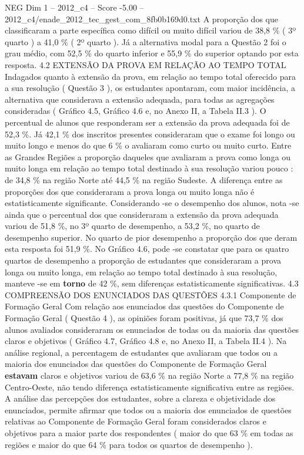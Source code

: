 \begin{textsample}{NEG Dim 1 – 2012\_c4 – Score -5.00 – 2012\_c4/enade\_2012\_tec\_gest\_com\_8fb0b169d0.txt}
A proporção dos que classificaram a parte específica como difícil ou muito difícil variou de 38,8 \% ( 3º quarto ) a 41,0 \% ( 2º quarto ).
Já a alternativa modal para a Questão 2 foi o grau médio, com 52,5 \% do quarto inferior e 55,9 \% do superior optando por esta resposta. 4.2 EXTENSÃO DA PROVA EM RELAÇÃO AO TEMPO TOTAL Indagados quanto à extensão da prova, em relação ao tempo total oferecido para a sua resolução ( Questão 3 ), os estudantes apontaram, com maior incidência, a alternativa que considerava a extensão adequada, para todas as agregações consideradas ( Gráfico 4.5, Gráfico 4.6 e, no Anexo II, a Tabela II.3 ).
O percentual de alunos que responderam ser a extensão da prova adequada foi de 52,3 \%.
Já 42,1 \% dos inscritos presentes consideraram que o exame foi longo ou muito longo e menos do que 6 \% o avaliaram como curto ou muito curto.
Entre as Grandes Regiões a proporção daqueles que avaliaram a prova como longa ou muito longa em relação ao tempo total destinado à sua resolução variou pouco : de 34,8 \% na região Norte até 44,5 \% na região Sudeste.
A diferença entre as proporções dos que consideraram a prova longa ou muito longa não é estatisticamente significante.
Considerando -se o desempenho dos alunos, nota -se ainda que o percentual dos que consideraram a extensão da prova adequada variou de 51,8 \%, no 3º quarto de desempenho, a 53,2 \%, no quarto de desempenho superior.
No quarto de pior desempenho a proporção dos que deram esta resposta foi 51,9 \%.
No Gráfico 4.6, pode -se constatar que para os quatro quartos de desempenho a proporção de estudantes que consideraram a prova longa ou muito longa, em relação ao tempo total destinado à sua resolução, manteve -se em \textbf{torno} de 42 \%, sem diferenças estatisticamente significativas. 4.3 COMPREENSÃO DOS ENUNCIADOS DAS QUESTÕES 4.3.1 Componente de Formação Geral Com relação aos enunciados das questões do Componente de Formação Geral ( Questão 4 ), as opiniões foram positivas, já que 73,7 \% dos alunos avaliados consideraram os enunciados de todas ou da maioria das questões claros e objetivos ( Gráfico 4.7, Gráfico 4.8 e, no Anexo II, a Tabela II.4 ).
Na análise regional, a percentagem de estudantes que avaliaram que todos ou a maioria dos enunciados das questões do Componente de Formação Geral \textbf{estavam} claros e objetivos variou de 63,6 \% na região Norte a 77,8 \% na região Centro-Oeste, não tendo diferença estatisticamente significativa entre as regiões.
A análise das percepções dos estudantes, sobre a clareza e objetividade dos enunciados, permite afirmar que todos ou a maioria dos enunciados de questões relativas ao Componente de Formação Geral foram considerados claros e objetivos para a maior parte dos respondentes ( maior do que 63 \% em todas as regiões e maior do que 64 \% para todos os quartos de desempenho ).

\end{textsample}
